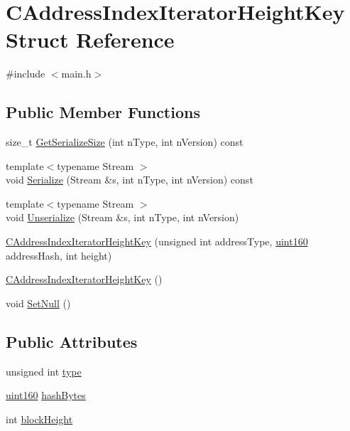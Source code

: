 \hypertarget{struct_c_address_index_iterator_height_key}{}\section{C\+Address\+Index\+Iterator\+Height\+Key Struct Reference}
\label{struct_c_address_index_iterator_height_key}


{\ttfamily \#include $<$main.\+h$>$}

\subsection*{Public Member Functions}
\begin{DoxyCompactItemize}
\item 
size\+\_\+t \mbox{\hyperlink{struct_c_address_index_iterator_height_key_a63f4371f6e24cfc0410c71fde0395901}{Get\+Serialize\+Size}} (int n\+Type, int n\+Version) const
\item 
{\footnotesize template$<$typename Stream $>$ }\\void \mbox{\hyperlink{struct_c_address_index_iterator_height_key_aa7c5a9682fc40e16943a0ec0a020bf8b}{Serialize}} (Stream \&s, int n\+Type, int n\+Version) const
\item 
{\footnotesize template$<$typename Stream $>$ }\\void \mbox{\hyperlink{struct_c_address_index_iterator_height_key_ac30c8b043ec7e773120e47346fb15ac4}{Unserialize}} (Stream \&s, int n\+Type, int n\+Version)
\item 
\mbox{\hyperlink{struct_c_address_index_iterator_height_key_a9b9b5c2de6b49c3f4e0505dcf62e3ced}{C\+Address\+Index\+Iterator\+Height\+Key}} (unsigned int address\+Type, \mbox{\hyperlink{classuint160}{uint160}} address\+Hash, int height)
\item 
\mbox{\hyperlink{struct_c_address_index_iterator_height_key_ae7cdd7f2d435b1aa3d9dc1a8f8b88ebc}{C\+Address\+Index\+Iterator\+Height\+Key}} ()
\item 
void \mbox{\hyperlink{struct_c_address_index_iterator_height_key_aff779cc8c0aafe1fda522822de996cf1}{Set\+Null}} ()
\end{DoxyCompactItemize}
\subsection*{Public Attributes}
\begin{DoxyCompactItemize}
\item 
unsigned int \mbox{\hyperlink{struct_c_address_index_iterator_height_key_a3aeef3918aebc23da830715dc3b4a247}{type}}
\item 
\mbox{\hyperlink{classuint160}{uint160}} \mbox{\hyperlink{struct_c_address_index_iterator_height_key_a581fde27d32792608fbda14ed1c7285a}{hash\+Bytes}}
\item 
int \mbox{\hyperlink{struct_c_address_index_iterator_height_key_ae6eaaff49b9c3e3c99a32c4741b500db}{block\+Height}}
\end{DoxyCompactItemize}


